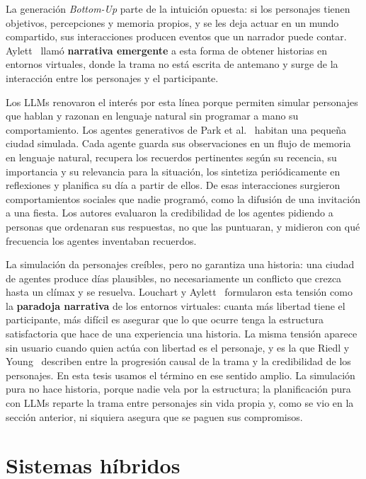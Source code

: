 La generación \textit{Bottom-Up} parte de la intuición opuesta: si los personajes tienen objetivos,
percepciones y memoria propios, y se les deja actuar en un mundo compartido, sus interacciones
producen eventos que un narrador puede contar. Aylett~\cite{aylett1999} llamó \textbf{narrativa
emergente} a esta forma de obtener historias en entornos virtuales, donde la trama no está escrita de
antemano y surge de la interacción entre los personajes y el participante.

Los LLMs renovaron el interés por esta línea porque permiten simular personajes que hablan y
razonan en lenguaje natural sin programar a mano su comportamiento. Los agentes generativos de Park
et al.~\cite{park2023} habitan una pequeña ciudad simulada. Cada agente guarda sus observaciones en
un flujo de memoria en lenguaje natural, recupera los recuerdos pertinentes según su recencia, su
importancia y su relevancia para la situación, los sintetiza periódicamente en reflexiones y
planifica su día a partir de ellos. De esas interacciones surgieron comportamientos sociales que
nadie programó, como la difusión de una invitación a una fiesta. Los autores evaluaron la
credibilidad de los agentes pidiendo a personas que ordenaran sus respuestas, no que las puntuaran,
y midieron con qué frecuencia los agentes inventaban recuerdos.

La simulación da personajes creíbles, pero no garantiza una historia: una ciudad de agentes produce
días plausibles, no necesariamente un conflicto que crezca hasta un clímax y se resuelva. Louchart y
Aylett~\cite{louchart2003} formularon esta tensión como la \textbf{paradoja narrativa} de los
entornos virtuales: cuanta más libertad tiene el participante, más difícil es asegurar que lo que
ocurre tenga la estructura satisfactoria que hace de una experiencia una historia. La misma tensión
aparece sin usuario cuando quien actúa con libertad es el personaje, y es la que Riedl y
Young~\cite{riedl2010} describen entre la progresión causal de la trama y la credibilidad de los
personajes. En esta tesis usamos el término en ese sentido amplio. La simulación pura no hace
historia, porque nadie vela por la estructura; la planificación pura con LLMs reparte la trama entre
personajes sin vida propia y, como se vio en la sección anterior, ni siquiera asegura que se paguen
sus compromisos.

\section{Sistemas híbridos}\label{sec:hibridos}

